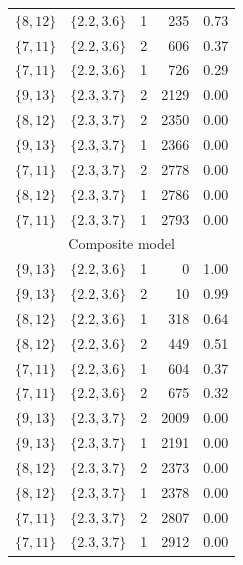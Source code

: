 \documentclass[longauth]{aa}
\begin{document}
\begin{table}
\begin{tabular}{cccrc}
$\{8, 12\}$ & $\{ 2.2,3.6 \}$ & 1 & 235 & 0.73 \\
$\{7, 11\}$ & $\{ 2.2,3.6 \}$ & 2 & 606 & 0.37 \\
$\{7, 11\}$ & $\{ 2.2,3.6 \}$ & 1 & 726 & 0.29 \\
$\{9, 13\}$ & $\{ 2.3,3.7 \}$ & 2 & 2129 & 0.00 \\
$\{8, 12\}$ & $\{ 2.3,3.7 \}$ & 2 & 2350 & 0.00 \\
$\{9, 13\}$ & $\{ 2.3,3.7 \}$ & 1 & 2366 & 0.00 \\
$\{7, 11\}$ & $\{ 2.3,3.7 \}$ & 2 & 2778 & 0.00 \\
$\{8, 12\}$ & $\{ 2.3,3.7 \}$ & 1 & 2786 & 0.00 \\
$\{7, 11\}$ & $\{ 2.3,3.7 \}$ & 1 & 2793 & 0.00 \\
\hline
\multicolumn{5}{c}{Composite model} \\
\hline
$\{9, 13\}$ & $\{ 2.2,3.6 \}$ & 1 & 0 & 1.00 \\
$\{9, 13\}$ & $\{ 2.2,3.6 \}$ & 2 & 10 & 0.99 \\
$\{8, 12\}$ & $\{ 2.2,3.6 \}$ & 1 & 318 & 0.64 \\
$\{8, 12\}$ & $\{ 2.2,3.6 \}$ & 2 & 449 & 0.51 \\
$\{7, 11\}$ & $\{ 2.2,3.6 \}$ & 1 & 604 & 0.37 \\
$\{7, 11\}$ & $\{ 2.2,3.6 \}$ & 2 & 675 & 0.32 \\
$\{9, 13\}$ & $\{ 2.3,3.7 \}$ & 2 & 2009 & 0.00 \\
$\{9, 13\}$ & $\{ 2.3,3.7 \}$ & 1 & 2191 & 0.00 \\
$\{8, 12\}$ & $\{ 2.3,3.7 \}$ & 2 & 2373 & 0.00 \\
$\{8, 12\}$ & $\{ 2.3,3.7 \}$ & 1 & 2378 & 0.00 \\
$\{7, 11\}$ & $\{ 2.3,3.7 \}$ & 2 & 2807 & 0.00 \\
$\{7, 11\}$ & $\{ 2.3,3.7 \}$ & 1 & 2912 & 0.00 \\
\hline
\end{tabular}
\end{table}
\end{document}
